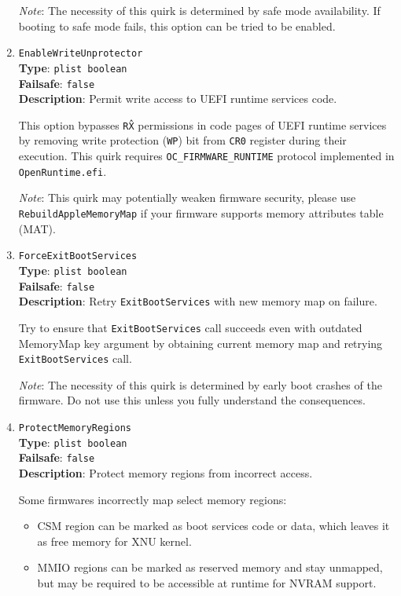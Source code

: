 \documentclass[]{article}
\providecommand{\tightlist}{%
  \setlength{\itemsep}{0pt}\setlength{\parskip}{0pt}}
\begin{document}
\begin{enumerate}
  \emph{Note}: The necessity of this quirk is determined by safe mode availability. If
  booting to safe mode fails, this option can be tried to be enabled.

\item
  \texttt{EnableWriteUnprotector}\\
  \textbf{Type}: \texttt{plist\ boolean}\\
  \textbf{Failsafe}: \texttt{false}\\
  \textbf{Description}: Permit write access to UEFI runtime services code.

  This option bypasses \texttt{R\^X} permissions in code pages of UEFI runtime
  services by removing write protection (\texttt{WP}) bit from \texttt{CR0}
  register during their execution. This quirk requires \texttt{OC\_FIRMWARE\_RUNTIME}
  protocol implemented in \texttt{OpenRuntime.efi}.

  \emph{Note}: This quirk may potentially weaken firmware security, please use
  \texttt{RebuildAppleMemoryMap} if your firmware supports memory attributes table (MAT).

\item
  \texttt{ForceExitBootServices}\\
  \textbf{Type}: \texttt{plist\ boolean}\\
  \textbf{Failsafe}: \texttt{false}\\
  \textbf{Description}: Retry \texttt{ExitBootServices} with new memory map on failure.

  Try to ensure that \texttt{ExitBootServices} call succeeds even with outdated MemoryMap
  key argument by obtaining current memory map and retrying \texttt{ExitBootServices} call.

  \emph{Note}: The necessity of this quirk is determined by early boot crashes
  of the firmware. Do not use this unless you fully understand the consequences.

\item
  \texttt{ProtectMemoryRegions}\\
  \textbf{Type}: \texttt{plist\ boolean}\\
  \textbf{Failsafe}: \texttt{false}\\
  \textbf{Description}: Protect memory regions from incorrect access.

  Some firmwares incorrectly map select memory regions:

  \begin{itemize}
    \tightlist
    \item CSM region can be marked as boot services code or data, which
      leaves it as free memory for XNU kernel.
    \item MMIO regions can be marked as reserved memory and stay unmapped,
      but may be required to be accessible at runtime for NVRAM support.
  \end{itemize}


\end{enumerate}
\end{document}
